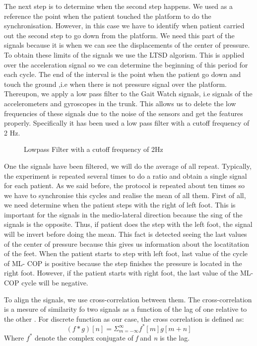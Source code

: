 The next step is to determine when the second step happens. We used as a reference the point when the patient touched the platform to do the synchronisation. However, in this case we have to identify when patient carried out the second step to go down from the platform. We need this part of the signals because it is when we can see the displacements of the center of pressure. To obtain these limits of the signals we use the LTSD algorism. This is applied over the acceleration signal so we can determine the beginning of this period for each cycle. The end of the interval is the point when the patient go down and touch the ground ,i.e when there is not pressure signal over the platform.
Thereupon, we apply a low pass filter to the  Gait Watch signals, i.e signals of the accelerometers and gyroscopes in the trunk. This allows us to delete the low frequencies  of these signals due to the noise of the sensors and get the features properly. Specifically it has been used a low pass filter with a cutoff frequency of 2 Hz.

\begin{figure}[H]
	\centering
	\caption{Lowpass Filter with a cutoff frequency of 2Hz}
	\label{fig:lowpassFilter}
\end{figure} 

One the signals have been filtered, we will do the average of all repeat. Typically, the experiment is repeated several times to do a ratio and obtain a single signal for each patient. As we said before, the protocol is repeated about ten times so we have to synchronise this cycles and realise the mean of all them.  First of all, we need determine when the patient steps with the right of left foot. This is important for the signals in the medio-lateral direction because the sing of the signals is the opposite. Thus, if patient does the step with the left foot, the signal will be invert before doing the mean. This fact is detected seeing the last values of the center of pressure because this gives us information about the locatitation of the feet.
When the patient starts to step with left foot, last value of the cycle of ML- COP is positive because the step finishes the pressure is located in the right foot. However, if the patient starts with right foot, the last value of the ML-COP cycle will be negative.

To align the signals, we use cross-correlation between them. The cross-correlation is a mesure of similarity fo two signals as a function of the lag of one relative to the other \cite{Cross-corr}. For discrete function as our case, the cross correlation is defined as:
\begin{equation}
\label{cross-corr}
(f*g)[n]=\varSigma_{m=-\infty}^{\infty} f^{*}[m]g[m+n]
\end{equation}
Where $ f^{*}$ denote the complex conjugate of \textit{f} and \textit{n} is the lag.


